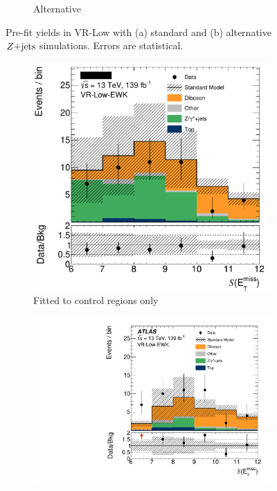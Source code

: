 \begin{figure}[tp]
\begin{subfigure}{0.48\textwidth}
\caption{Alternative}
\end{subfigure}
\caption[
Pre-fit yields in VR-Low with standard and alternative $\zjets$ simulations
]{%
Pre-fit yields in VR-Low with (a) standard and (b) alternative $\zjets$
simulations.
Errors are statistical.
}
\label{fig:2ljets_vrlow_alt}
\end{figure}

\begin{figure}[tp]
\centering
\begin{subfigure}{0.48\textwidth}
\centering
\includegraphics[width=\textwidth]{figures/2ljets_prefit_VR_Low_EWK_met_Sign_no_sr.png}
\caption{Fitted to control regions only}
\end{subfigure}
\hfill
\begin{subfigure}{0.48\textwidth}
\centering
\includegraphics[width=\textwidth]{figures/2ljets_postfit_VR_Low_EWK_met_Sign.pdf}

\end{subfigure}
\end{figure}
